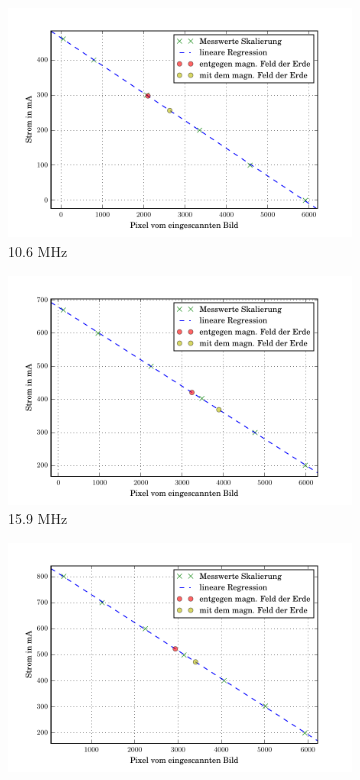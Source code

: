 \begin{figure}
  \centering
  \begin{subfigure}[b]{0.49\textwidth}
     \includegraphics[width=\textwidth]{picture/10MHz.pdf}
     \caption{10.6 MHz}
     \label{fig:10Reg}
  \end{subfigure}
  \begin{subfigure}[b]{0.49\textwidth}
     \includegraphics[width=\textwidth]{picture/15MHz.pdf}
     \caption{15.9 MHz}
     \label{fig:15Reg}
  \end{subfigure}
  \begin{subfigure}[b]{0.49\textwidth}
     \includegraphics[width=\textwidth]{picture/20MHz.pdf}

\end{subfigure}
\end{figure}
